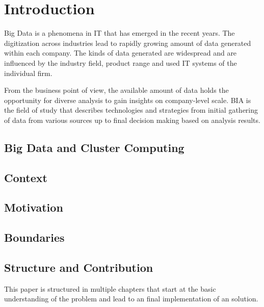 \chapter{Introduction}
\label{chap:intro}

Big Data is a phenomena in \ac{IT} that has emerged in the recent years.
The digitization across industries lead to rapidly growing amount of data generated
within each company.
The kinds of data generated are widespread 
and are influenced by the industry field, product range and used \ac{IT} systems 
of the individual firm.

From the business point of view, the available amount of data 
holds the opportunity for diverse analysis to gain insights on company-level scale.
\ac{BIA} is the field of study that describes technologies and strategies 
from initial gathering of data from various sources 
up to final decision making based on analysis results.    

\section{Big Data and Cluster Computing}
\label{sec:intro:cluster}


\section{Context}
\label{sec:intro:context}

\section{Motivation}
\label{sec:intro:motivation}

\section{Boundaries}
\label{sec:intro:boundaries}

\section{Structure and Contribution}
\label{sec:intro:structure}

This paper is structured in multiple chapters that start at the basic understanding of the problem 
and lead to an final implementation of an solution.

